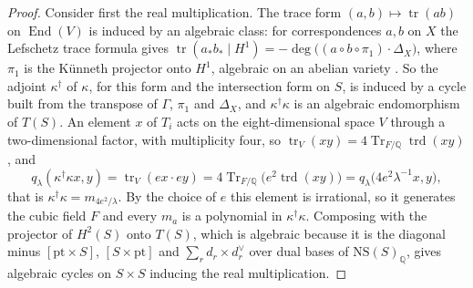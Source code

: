 \documentclass[11pt,reqno]{amsart}
\theoremstyle{plain}
\theoremstyle{definition}
\theoremstyle{remark}
\newcommand{\QQ}{\mathbb{Q}}
\newcommand{\NS}{\mathrm{NS}}
\DeclareMathOperator{\End}{End}
\DeclareMathOperator{\Tr}{Tr}
\begin{document}
\begin{proof}
Consider first the real multiplication. The trace form
$(a,b)\mapsto\operatorname{tr}(ab)$ on $\End(V)$ is induced by an algebraic
class: for correspondences $a,b$ on $X$
the Lefschetz trace formula gives
$\operatorname{tr}(a_{*}b_{*}\mid H^{1})=-\deg\bigl((a\circ b\circ\pi_{1})\cdot\Delta_{X}\bigr)$,
where $\pi_{1}$ is the K\"unneth projector onto $H^{1}$, algebraic on an
abelian variety \cite[\S2]{Kle68}. So the adjoint $\kappa^{\dagger}$ of
$\kappa$, for this form and the intersection form on $S$, is induced by a
cycle built from the transpose of $\Gamma$, $\pi_{1}$ and $\Delta_{X}$, and
$\kappa^{\dagger}\kappa$ is an algebraic endomorphism of $T(S)$. An element
$x$ of $T_{i}$ acts on the eight-dimensional space $V$ through a
two-dimensional factor, with multiplicity four, so
$\operatorname{tr}_{V}(xy)=4\Tr_{F/\QQ}\operatorname{trd}(xy)$, and
\[
  q_{\lambda}(\kappa^{\dagger}\kappa x,y)
  =\operatorname{tr}_{V}(ex\cdot ey)
  =4\Tr_{F/\QQ}\bigl(e^{2}\operatorname{trd}(xy)\bigr)
  =q_{\lambda}\bigl(4e^{2}\lambda^{-1}x,y\bigr),
\]
that is $\kappa^{\dagger}\kappa=m_{4e^{2}/\lambda}$. By the choice of $e$ this
element is irrational, so it generates the cubic field $F$ and every $m_{a}$
is a polynomial in $\kappa^{\dagger}\kappa$. Composing with the projector of
$H^{2}(S)$ onto $T(S)$, which is algebraic because it is the diagonal minus
$[\mathrm{pt}\times S]$, $[S\times\mathrm{pt}]$ and $\sum_{r}d_{r}\times d_{r}^{\vee}$
over dual bases of $\NS(S)_{\QQ}$, gives algebraic cycles on $S\times S$
inducing the real multiplication.


\end{proof}
\end{document}
